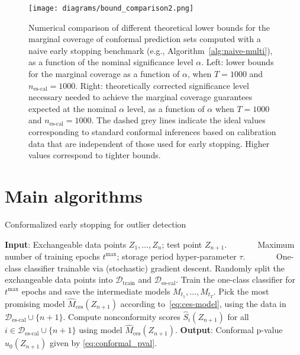 \begin{figure}
    \centering
    \texttt{[image: diagrams/bound\_comparison2.png]}
    \caption{Numerical comparison of different theoretical lower bounds for the marginal coverage of conformal prediction sets computed with a naive early stopping benchmark (e.g., Algorithm~\ref{alg:naive-multi}), as a function of the nominal significance level $\alpha$. Left: lower bounds for the marginal coverage as a function of $\alpha$, when $T = 1000$ and $n_{\text{es-cal}}= 1000$.
Right: theoretically corrected significance level necessary needed to achieve the marginal coverage guarantees expected at the nominal $\alpha$ level, as a function of $\alpha$ when $T = 1000$ and $n_{\text{es-cal}}= 1000$. The dashed grey lines indicate the ideal values corresponding to standard conformal inferences based on calibration data that are independent of those used for early stopping. Higher values correspond to tighter bounds.
}
    \label{fig:bound_alpha}
\end{figure}


\section{Main algorithms} \label{app:algorithms}

\begin{algorithm}[H]
    \caption{Conformalized early stopping for outlier detection}
    \label{alg:od_full_seq}
    \begin{algorithmic}[1]
        \STATE \textbf{Input}: Exchangeable data points $Z_1, \ldots, Z_n$; test point $Z_{n+1}$.
        \STATE \textcolor{white}{\textbf{Input}:} Maximum number of training epochs $t^{\max}$; storage period hyper-parameter $\tau$.
        \STATE \textcolor{white}{\textbf{Input}:} One-class classifier trainable via (stochastic) gradient descent.
        \STATE Randomly split the exchangeable data points into $\mathcal{D}_{\text{train}}$ and $\mathcal{D}_{\text{es-cal}}$.
        \STATE Train the one-class classifier for $t^{\text{max}}$ epochs and save the intermediate models $M_{t_1} , \dots, M_{t_T}$.
        \STATE Pick the most promising model $\hat{M}_{\text{ces}}(Z_{n+1})$ according to~\eqref{eq:ces-model}, using the data in $\mathcal{D}_{\text{es-cal}} \cup \{n+1\}$.
        \STATE Compute nonconformity scores $\hat{S}_i(Z_{n+1})$ for all $i \in \mathcal{D}_{\text{es-cal}} \cup \{n+1\}$ using model $\hat{M}_{\text{ces}}(Z_{n+1})$.
        \STATE \textbf{Output}: Conformal p-value $\hat{u}_0(Z_{n+1})$ given by \eqref{eq:conformal_pval}.
    \end{algorithmic}
\end{algorithm}

